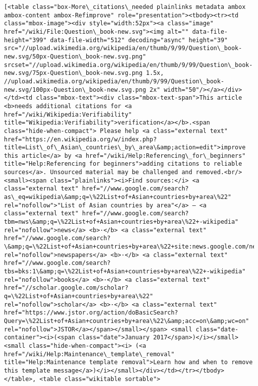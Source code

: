 \documentclass[11pt]{article}
\begin{document}
\begin{Verbatim}[commandchars=\\\{\}]
[<table class="box-More\_citations\_needed plainlinks metadata ambox ambox-content ambox-Refimprove" role="presentation"><tbody><tr><td class="mbox-image"><div style="width:52px"><a class="image" href="/wiki/File:Question\_book-new.svg"><img alt="" data-file-height="399" data-file-width="512" decoding="async" height="39" src="//upload.wikimedia.org/wikipedia/en/thumb/9/99/Question\_book-new.svg/50px-Question\_book-new.svg.png" srcset="//upload.wikimedia.org/wikipedia/en/thumb/9/99/Question\_book-new.svg/75px-Question\_book-new.svg.png 1.5x, //upload.wikimedia.org/wikipedia/en/thumb/9/99/Question\_book-new.svg/100px-Question\_book-new.svg.png 2x" width="50"/></a></div></td><td class="mbox-text"><div class="mbox-text-span">This article <b>needs additional citations for <a href="/wiki/Wikipedia:Verifiability" title="Wikipedia:Verifiability">verification</a></b>.<span class="hide-when-compact"> Please help <a class="external text" href="https://en.wikipedia.org/w/index.php?title=List\_of\_Asian\_countries\_by\_area\&amp;action=edit">improve this article</a> by <a href="/wiki/Help:Referencing\_for\_beginners" title="Help:Referencing for beginners">adding citations to reliable sources</a>. Unsourced material may be challenged and removed.<br/><small><span class="plainlinks"><i>Find sources:</i> <a class="external text" href="//www.google.com/search?as\_eq=wikipedia\&amp;q=\%22List+of+Asian+countries+by+area\%22" rel="nofollow">"List of Asian countries by area"</a> – <a class="external text" href="//www.google.com/search?tbm=nws\&amp;q=\%22List+of+Asian+countries+by+area\%22+-wikipedia" rel="nofollow">news</a> <b>·</b> <a class="external text" href="//www.google.com/search?\&amp;q=\%22List+of+Asian+countries+by+area\%22+site:news.google.com/newspapers\&amp;source=newspapers" rel="nofollow">newspapers</a> <b>·</b> <a class="external text" href="//www.google.com/search?tbs=bks:1\&amp;q=\%22List+of+Asian+countries+by+area\%22+-wikipedia" rel="nofollow">books</a> <b>·</b> <a class="external text" href="//scholar.google.com/scholar?q=\%22List+of+Asian+countries+by+area\%22" rel="nofollow">scholar</a> <b>·</b> <a class="external text" href="https://www.jstor.org/action/doBasicSearch?Query=\%22List+of+Asian+countries+by+area\%22\&amp;acc=on\&amp;wc=on" rel="nofollow">JSTOR</a></span></small></span> <small class="date-container"><i>(<span class="date">January 2017</span>)</i></small><small class="hide-when-compact"><i> (<a href="/wiki/Help:Maintenance\_template\_removal" title="Help:Maintenance template removal">Learn how and when to remove this template message</a>)</i></small></div></td></tr></tbody></table>, <table class="wikitable sortable">

\end{Verbatim}
\end{document}

